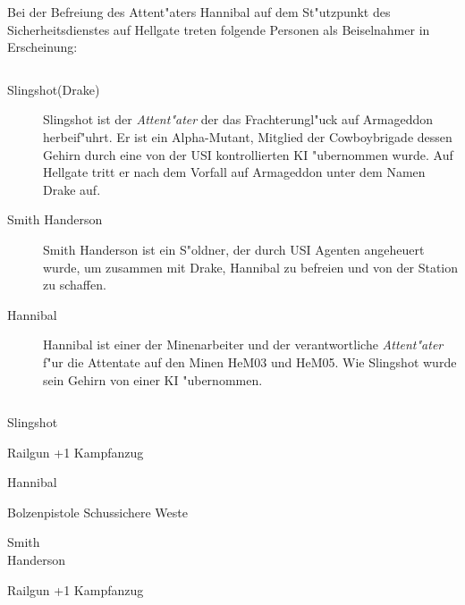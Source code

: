 \newpage
{}

Bei der Befreiung des Attent"aters Hannibal auf dem St"utzpunkt des Sicherheitsdienstes auf Hellgate treten folgende Personen 
als Beiselnahmer in Erscheinung:

\begin{column}[l]{0.45}
    \begin{description}
        \item[Slingshot(Drake)] Slingshot ist der \emph{Attent"ater} der das Frachterungl"uck auf Armageddon herbeif"uhrt. Er ist 
            ein Alpha-Mutant, Mitglied der Cowboybrigade dessen Gehirn durch eine von der USI kontrollierten KI "ubernommen wurde. 
            Auf Hellgate tritt er nach dem Vorfall auf Armageddon unter dem Namen Drake auf.
        \item[Smith Handerson] Smith Handerson ist ein S"oldner, der durch USI Agenten angeheuert wurde, um 
            zusammen mit Drake, Hannibal zu befreien und von der Station zu schaffen.
        \item[Hannibal] Hannibal ist einer der Minenarbeiter und der verantwortliche \emph{Attent"ater} f"ur die Attentate auf den Minen 
            HeM03 und HeM05. Wie Slingshot wurde sein Gehirn von einer KI "ubernommen.
    \end{description}
\end{column}
\begin{column}[r]{0.45}
    \begin{nscsheet}[h]{Slingshot}
        \nscstats[ATT=1,AGG=2,DEX=3]
        \nscruler
        \begin{nscinventory}
            \nscitem[Waffen] Railgun +1
            \nscitem[R"ustung] Kampfanzug
        \end{nscinventory}
    \end{nscsheet}    

    \begin{nscsheet}[h]{Hannibal}
        \nscstats[ATT=1,AGG=2,DEX=3,COM=2,CON=2]
        \nscruler
        \begin{nscinventory}
            \nscitem[Waffen] Bolzenpistole
            \nscitem[R"ustung] Schussichere Weste
        \end{nscinventory}
    \end{nscsheet} 

    \begin{nscsheet}[h]{Smith\\ Handerson}
        \nscstats[ATT=3,AGG=2]
        \nscruler
        \begin{nscinventory}
            \nscitem[Waffen] Railgun +1
            \nscitem[R"ustung] Kampfanzug
        \end{nscinventory}
    \end{nscsheet}
\end{column}

\newpage